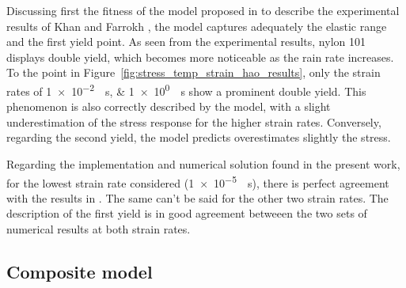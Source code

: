 Discussing first the fitness of the model proposed in \cite{haoUnifiedAmorphousCrystalline2022} to describe the experimental results of Khan and Farrokh \citep{khanThermomechanicalResponseNylon2006}, the model captures adequately the elastic range and the first yield point.
As seen from the experimental results, nylon 101 displays double yield, which becomes more noticeable as the rain rate increases.
To the point in Figure~\ref{fig:stress_temp_strain_hao_results}, only the strain rates of \SIlist{1e-2;1e0}{\per\second} show a prominent double yield.
This phenomenon is also correctly described by the model, with a slight underestimation of the stress response for the higher strain rates.
Conversely, regarding the second yield, the model predicts overestimates slightly the stress.

Regarding the implementation and numerical solution found in the present work, for the lowest strain rate considered (\SI{1e-5}{\per\second}), there is perfect agreement with the results in \cite{haoUnifiedAmorphousCrystalline2022}.
The same can't be said for the other two strain rates.
The description of the first yield is in good agreement betweeen the two sets of numerical results at both strain rates.


\subsection{Composite model}

